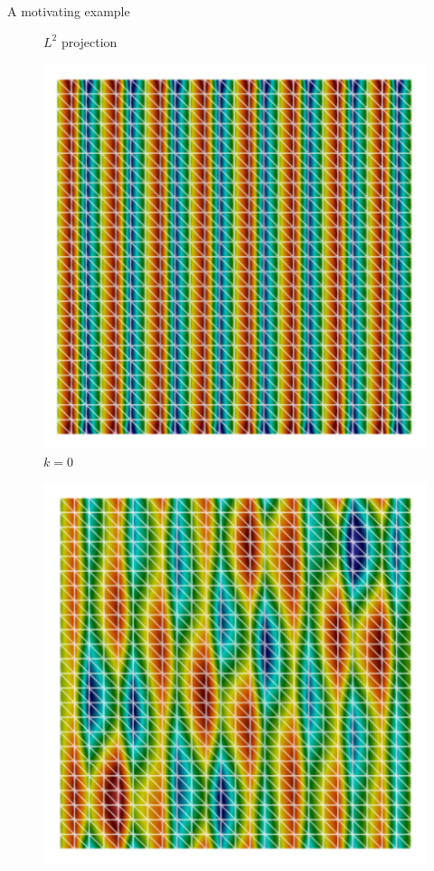 \documentclass[]{beamer}
\begin{document}
\begin{frame}{A motivating example}
{\begin{minipage}{0.3\textwidth}
\begin{figure}
					\caption{$L^2$ projection}
				\end{figure}
			\end{minipage}
			\begin{minipage}{0.3\textwidth}
				\begin{figure}
					\centering
					\includegraphics[scale=0.3]{Figures/poisson_N_24_omega_16.png}
					\caption{$k=0$}
				\end{figure}
			\end{minipage}
			\begin{minipage}{0.3\textwidth}
				\begin{figure}
					\centering
					\includegraphics[scale=0.3]{Figures/helmholtz_N_24_omega_16.png}

\end{figure}
\end{minipage}}
\end{frame}
\end{document}
